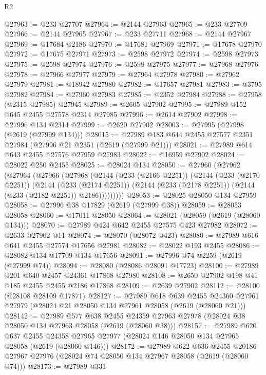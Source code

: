 \begin{lexlean}{R2}
\begin{coremodule}
@27963 := @233 @27707
@27964 := @2144 @27963
@27965 := @233 @27709
@27966 := @2144 @27965
@27967 := @233 @27711
@27968 := @2144 @27967
@27969 := @17684 @2186
@27970 := @17681 @27969
@27971 := @17678 @27970
@27972 := @17675 @27971
@27973 := @2598 @27972
@27974 := @2598 @27973
@27975 := @2598 @27974
@27976 := @2598 @27975
@27977 := @27968 @27976
@27978 := @27966 @27977
@27979 := @27964 @27978
@27980 := @27962 @27979
@27981 := @18942 @27980
@27982 := @17657 @27981
@27983 := @3795 @27982
@27984 := @27960 @27983
@27985 := @2352 @27984
@27988 := @27958 (@2315 @27985) @27945
@27989 := @2605 @27902
@27995 := @27989 @152 @645 @2455 @27578 @2314 @27985
@27996 := @2614 @27902
@27998 := @27996 @134 @2314
@27999 := @2620 @27902
@28003 := @27995 (@27998 (@2619 (@27999 @134)))
@28015 := @27989 @183 @644 @2455 @27577 @2351 @27984 (@27996 @21 @2351 (@2619 (@27999 @21)))
@28021 := @27989 @614 @643 @2455 @27576 @27959 @27983
@28022 := @16959 @27902
@28024 := @28022 @250 @2455
@28025 := @28024 @134
@28050 := @27960
    (@27962
      (@27964
        (@27966
          (@27968
            (@2144
              (@233 (@2166 @2251))
              (@2144
                (@233 (@2170 @2251))
                (@2144
                  (@233 (@2174 @2251))
                  (@2144 (@233 (@2178 @2251)) (@2144 (@233 (@2182 @2251)) @2186)))))))))
@28053 := @28025 @28050 @134 @27959
@28058 := @27996 @38 @17829 (@2619 (@27999 @38))
@28059 := @28053 @28058
@28060 := @17011 @28050
@28064 := @28021 (@28059 (@2619 (@28060 @134)))
@28070 := @27989 @424 @642 @2455 @27575 @423 @27982
@28072 := @2633 @27902 @11
@28074 := @28070 (@28072 @423)
@28080 := @27989 @616 @641 @2455 @27574 @17656 @27981
@28082 := @28022 @193 @2455
@28086 := @28082 @134 @17709 @134 @17656
@28091 := @27996 @74 @2259 (@2619 (@27999 @74))
@28094 := @28080 (@28086 @28091 @17723)
@28100 := @27989 @201 @640 @2457 @24361 @17868 @27980
@28108 := @2650 @27902 @198 @41 @185 @2455 @2455 @2186 @17868
@28109 := @2639 @27902
@28112 := @28100 (@28108 @28109 @17871)
@28127 := @27989
    @618
    @639
    @2455
    @24360
    @27961
    @27979
    (@28024 @21 @28050 @134 @27961 @28058 (@2619 (@28060 @21)))
@28142 := @27989
    @577
    @638
    @2455
    @24359
    @27963
    @27978
    (@28024 @38 @28050 @134 @27963 @28058 (@2619 (@28060 @38)))
@28157 := @27989
    @620
    @637
    @2455
    @24358
    @27965
    @27977
    (@28024 @146 @28050 @134 @27965 @28058 (@2619 (@28060 @146)))
@28172 := @27989
    @622
    @636
    @2455
    @20186
    @27967
    @27976
    (@28024 @74 @28050 @134 @27967 @28058 (@2619 (@28060 @74)))
@28173 := @27989 @331

\end{coremodule}
\end{lexlean}
